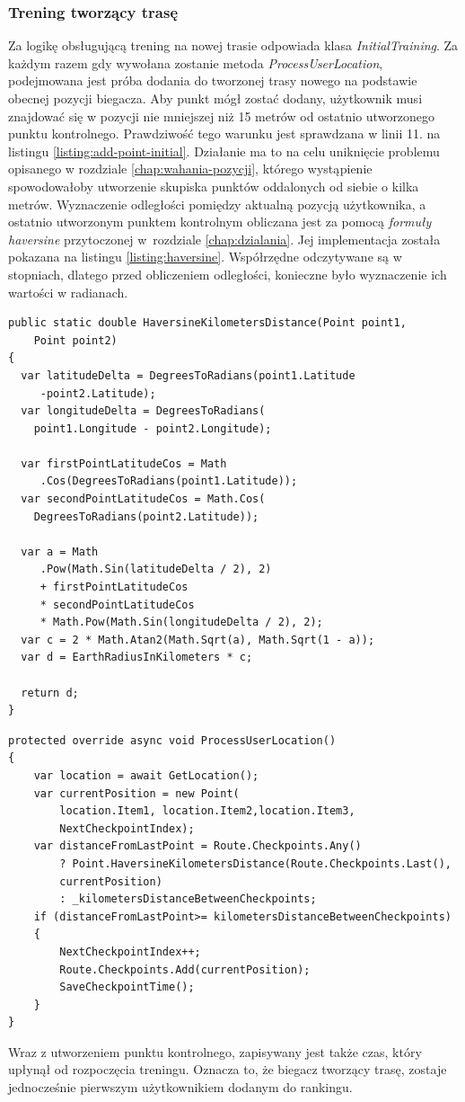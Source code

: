 \subsubsection{Trening tworzący trasę}
Za logikę obsługującą trening na nowej trasie odpowiada klasa \textit{InitialTraining}. Za każdym razem gdy wywołana zostanie metoda \textit{ProcessUserLocation}, podejmowana jest próba dodania do tworzonej trasy nowego na podstawie obecnej pozycji biegacza. Aby punkt mógł zostać dodany, użytkownik musi znajdować się w pozycji nie mniejszej niż 15 metrów od ostatnio utworzonego punktu kontrolnego. Prawdziwość tego warunku jest sprawdzana w linii 11. na listingu \ref{listing:add-point-initial}. Działanie ma to na celu uniknięcie problemu opisanego w rozdziale \ref{chap:wahania-pozycji}, którego wystąpienie spowodowałoby utworzenie skupiska punktów oddalonych od siebie o kilka metrów. Wyznaczenie odległości pomiędzy aktualną pozycją użytkownika, a ostatnio utworzonym punktem kontrolnym obliczana jest za pomocą \textit{formuły haversine} przytoczonej w~rozdziale \ref{chap:dzialania}. Jej implementacja została pokazana na listingu \ref{listing:haversine}. Współrzędne odczytywane są w stopniach, dlatego przed obliczeniem odległości, konieczne było wyznaczenie ich wartości w radianach.
\begin{lstlisting}[caption={Wyznaczenie odległości pomiędzy dwoma punktami},label=listing:haversine]
public static double HaversineKilometersDistance(Point point1,
	Point point2)
{
  var latitudeDelta = DegreesToRadians(point1.Latitude
     -point2.Latitude);
  var longitudeDelta = DegreesToRadians(
  	point1.Longitude - point2.Longitude);

  var firstPointLatitudeCos = Math
     .Cos(DegreesToRadians(point1.Latitude));
  var secondPointLatitudeCos = Math.Cos(
  	DegreesToRadians(point2.Latitude));

  var a = Math
     .Pow(Math.Sin(latitudeDelta / 2), 2)
     + firstPointLatitudeCos 
     * secondPointLatitudeCos 
     * Math.Pow(Math.Sin(longitudeDelta / 2), 2);
  var c = 2 * Math.Atan2(Math.Sqrt(a), Math.Sqrt(1 - a));
  var d = EarthRadiusInKilometers * c;

  return d;
}
\end{lstlisting}

\begin{lstlisting}[caption={Tworzenie punktów kontrolnych},label=listing:add-point-initial]
protected override async void ProcessUserLocation()
{
    var location = await GetLocation();
    var currentPosition = new Point(
    	location.Item1, location.Item2,location.Item3,
    	NextCheckpointIndex);
    var distanceFromLastPoint = Route.Checkpoints.Any()
        ? Point.HaversineKilometersDistance(Route.Checkpoints.Last(),
        currentPosition)
        : _kilometersDistanceBetweenCheckpoints;
    if (distanceFromLastPoint>= kilometersDistanceBetweenCheckpoints)
    {
        NextCheckpointIndex++;
        Route.Checkpoints.Add(currentPosition);
        SaveCheckpointTime();
    }
}
\end{lstlisting}
Wraz z utworzeniem punktu kontrolnego, zapisywany jest także czas, który upłynął od rozpoczęcia treningu. Oznacza to, że biegacz tworzący trasę, zostaje jednocześnie pierwszym użytkownikiem dodanym do rankingu.


